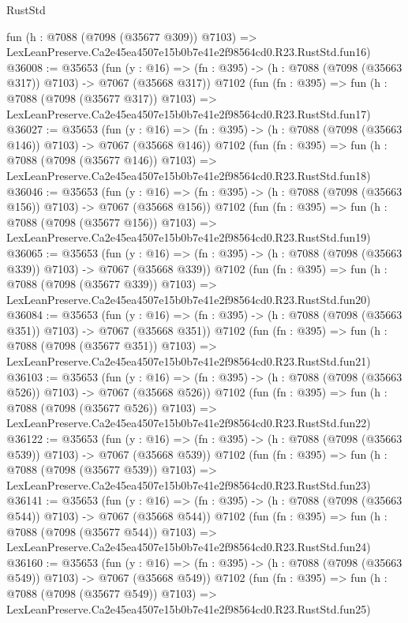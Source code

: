 \begin{lexlean}{RustStd}
\begin{coremodule}
    fun (h : @7088 (@7098 (@35677 @309)) @7103) =>
    LexLeanPreserve.Ca2e45ea4507e15b0b7e41e2f98564cd0.R23.RustStd.fun16)
@36008 := @35653
    (fun (y : @16) => (fn : @395) -> (h : @7088 (@7098 (@35663 @317)) @7103) -> @7067 (@35668 @317))
    @7102
    (fun (fn : @395) =>
    fun (h : @7088 (@7098 (@35677 @317)) @7103) =>
    LexLeanPreserve.Ca2e45ea4507e15b0b7e41e2f98564cd0.R23.RustStd.fun17)
@36027 := @35653
    (fun (y : @16) => (fn : @395) -> (h : @7088 (@7098 (@35663 @146)) @7103) -> @7067 (@35668 @146))
    @7102
    (fun (fn : @395) =>
    fun (h : @7088 (@7098 (@35677 @146)) @7103) =>
    LexLeanPreserve.Ca2e45ea4507e15b0b7e41e2f98564cd0.R23.RustStd.fun18)
@36046 := @35653
    (fun (y : @16) => (fn : @395) -> (h : @7088 (@7098 (@35663 @156)) @7103) -> @7067 (@35668 @156))
    @7102
    (fun (fn : @395) =>
    fun (h : @7088 (@7098 (@35677 @156)) @7103) =>
    LexLeanPreserve.Ca2e45ea4507e15b0b7e41e2f98564cd0.R23.RustStd.fun19)
@36065 := @35653
    (fun (y : @16) => (fn : @395) -> (h : @7088 (@7098 (@35663 @339)) @7103) -> @7067 (@35668 @339))
    @7102
    (fun (fn : @395) =>
    fun (h : @7088 (@7098 (@35677 @339)) @7103) =>
    LexLeanPreserve.Ca2e45ea4507e15b0b7e41e2f98564cd0.R23.RustStd.fun20)
@36084 := @35653
    (fun (y : @16) => (fn : @395) -> (h : @7088 (@7098 (@35663 @351)) @7103) -> @7067 (@35668 @351))
    @7102
    (fun (fn : @395) =>
    fun (h : @7088 (@7098 (@35677 @351)) @7103) =>
    LexLeanPreserve.Ca2e45ea4507e15b0b7e41e2f98564cd0.R23.RustStd.fun21)
@36103 := @35653
    (fun (y : @16) => (fn : @395) -> (h : @7088 (@7098 (@35663 @526)) @7103) -> @7067 (@35668 @526))
    @7102
    (fun (fn : @395) =>
    fun (h : @7088 (@7098 (@35677 @526)) @7103) =>
    LexLeanPreserve.Ca2e45ea4507e15b0b7e41e2f98564cd0.R23.RustStd.fun22)
@36122 := @35653
    (fun (y : @16) => (fn : @395) -> (h : @7088 (@7098 (@35663 @539)) @7103) -> @7067 (@35668 @539))
    @7102
    (fun (fn : @395) =>
    fun (h : @7088 (@7098 (@35677 @539)) @7103) =>
    LexLeanPreserve.Ca2e45ea4507e15b0b7e41e2f98564cd0.R23.RustStd.fun23)
@36141 := @35653
    (fun (y : @16) => (fn : @395) -> (h : @7088 (@7098 (@35663 @544)) @7103) -> @7067 (@35668 @544))
    @7102
    (fun (fn : @395) =>
    fun (h : @7088 (@7098 (@35677 @544)) @7103) =>
    LexLeanPreserve.Ca2e45ea4507e15b0b7e41e2f98564cd0.R23.RustStd.fun24)
@36160 := @35653
    (fun (y : @16) => (fn : @395) -> (h : @7088 (@7098 (@35663 @549)) @7103) -> @7067 (@35668 @549))
    @7102
    (fun (fn : @395) =>
    fun (h : @7088 (@7098 (@35677 @549)) @7103) =>
    LexLeanPreserve.Ca2e45ea4507e15b0b7e41e2f98564cd0.R23.RustStd.fun25)

\end{coremodule}
\end{lexlean}
